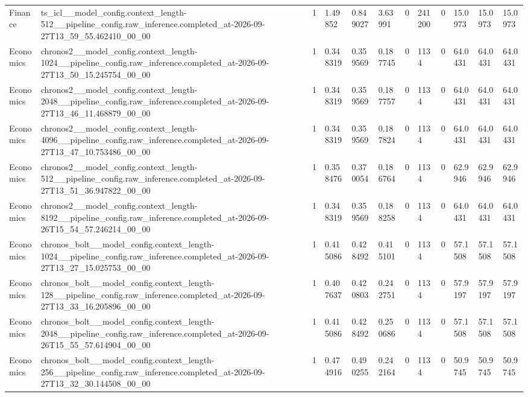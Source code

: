 \begin{tabular}{llllllllllll}
Finance & ts\_icl\_\_model\_config.context\_length-512\_\_pipeline\_config.raw\_inference.completed\_at-2026-09-27T13\_59\_55.462410\_00\_00 & 1 & 1.49852 & 0.849027 & 3.63991 & 0 & 241200 & 0 & 15.0973 & 15.0973 & 15.0973 \\
Economics & chronos2\_\_model\_config.context\_length-1024\_\_pipeline\_config.raw\_inference.completed\_at-2026-09-27T13\_50\_15.245754\_00\_00 & 1 & 0.348319 & 0.359569 & 0.187745 & 0 & 1134 & 0 & 64.0431 & 64.0431 & 64.0431 \\
Economics & chronos2\_\_model\_config.context\_length-2048\_\_pipeline\_config.raw\_inference.completed\_at-2026-09-27T13\_46\_11.468879\_00\_00 & 1 & 0.348319 & 0.359569 & 0.187757 & 0 & 1134 & 0 & 64.0431 & 64.0431 & 64.0431 \\
Economics & chronos2\_\_model\_config.context\_length-4096\_\_pipeline\_config.raw\_inference.completed\_at-2026-09-27T13\_47\_10.753486\_00\_00 & 1 & 0.348319 & 0.359569 & 0.187824 & 0 & 1134 & 0 & 64.0431 & 64.0431 & 64.0431 \\
Economics & chronos2\_\_model\_config.context\_length-512\_\_pipeline\_config.raw\_inference.completed\_at-2026-09-27T13\_51\_36.947822\_00\_00 & 1 & 0.358476 & 0.370054 & 0.186764 & 0 & 1134 & 0 & 62.9946 & 62.9946 & 62.9946 \\
Economics & chronos2\_\_model\_config.context\_length-8192\_\_pipeline\_config.raw\_inference.completed\_at-2026-09-26T15\_54\_57.246214\_00\_00 & 1 & 0.348319 & 0.359569 & 0.188258 & 0 & 1134 & 0 & 64.0431 & 64.0431 & 64.0431 \\
Economics & chronos\_bolt\_\_model\_config.context\_length-1024\_\_pipeline\_config.raw\_inference.completed\_at-2026-09-27T13\_27\_15.025753\_00\_00 & 1 & 0.415086 & 0.428492 & 0.415101 & 0 & 1134 & 0 & 57.1508 & 57.1508 & 57.1508 \\
Economics & chronos\_bolt\_\_model\_config.context\_length-128\_\_pipeline\_config.raw\_inference.completed\_at-2026-09-27T13\_33\_16.205896\_00\_00 & 1 & 0.407637 & 0.420803 & 0.242751 & 0 & 1134 & 0 & 57.9197 & 57.9197 & 57.9197 \\
Economics & chronos\_bolt\_\_model\_config.context\_length-2048\_\_pipeline\_config.raw\_inference.completed\_at-2026-09-26T15\_55\_57.614904\_00\_00 & 1 & 0.415086 & 0.428492 & 0.250686 & 0 & 1134 & 0 & 57.1508 & 57.1508 & 57.1508 \\
Economics & chronos\_bolt\_\_model\_config.context\_length-256\_\_pipeline\_config.raw\_inference.completed\_at-2026-09-27T13\_32\_30.144508\_00\_00 & 1 & 0.474916 & 0.490255 & 0.242164 & 0 & 1134 & 0 & 50.9745 & 50.9745 & 50.9745 \\

\end{tabular}
